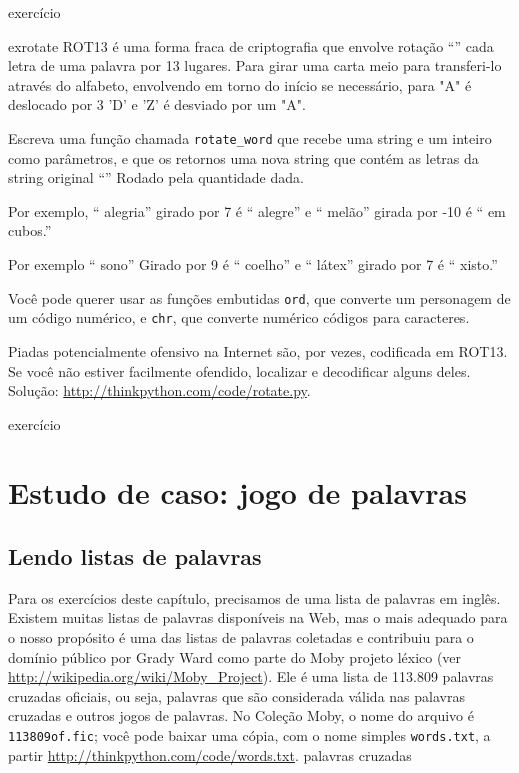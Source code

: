 \documentclass[10pt]{book}
\begin{document}
\begin{} exercício

\label{} exrotate
ROT13 é uma forma fraca de criptografia que envolve rotação ``'' cada
letra de uma palavra por 13 lugares. Para girar uma carta meio
para transferi-lo através do alfabeto, envolvendo em torno do início se
necessário, para "A" é deslocado por 3 'D' e 'Z' é desviado por um "A".

Escreva uma função chamada \verb "rotate_word"
que recebe uma string e um inteiro como parâmetros, e que os retornos
uma nova string que contém as letras da string original
``'' Rodado pela quantidade dada.  

Por exemplo, `` alegria'' girado por 7 é `` alegre'' e `` melão'' girada
por -10 é `` em cubos.''  

Por exemplo `` sono''
Girado por 9 é `` coelho'' e `` látex'' girado por 7 é `` xisto.''

Você pode querer usar as funções embutidas {\tt ord}, ​​que converte
um personagem de um código numérico, e {\tt chr}, ​​que converte numérico
códigos para caracteres.

Piadas potencialmente ofensivo na Internet são, por vezes, codificada
em ROT13. Se você não estiver facilmente ofendido, localizar e decodificar alguns
deles. Solução: \url{http://thinkpython.com/code/rotate.py}.

\end{} exercício


\chapter{Estudo de caso: jogo de palavras}

\section{Lendo listas de palavras}
\label{lista de palavras}

Para os exercícios deste capítulo, precisamos de uma lista de palavras em inglês.
Existem muitas listas de palavras disponíveis na Web, mas o mais
adequado para o nosso propósito é uma das listas de palavras coletadas e
contribuiu para o domínio público por Grady Ward como parte do Moby
projeto léxico (ver \url{http://wikipedia.org/wiki/Moby_Project}). Ele
é uma lista de 113.809 palavras cruzadas oficiais, ou seja, palavras que são
considerada válida nas palavras cruzadas e outros jogos de palavras. No
Coleção Moby, o nome do arquivo é {\tt 113809of.fic}; você pode baixar
uma cópia, com o nome simples {\tt words.txt}, a partir
\url{http://thinkpython.com/code/words.txt}.
\index{} palavras cruzadas
\end{document}
